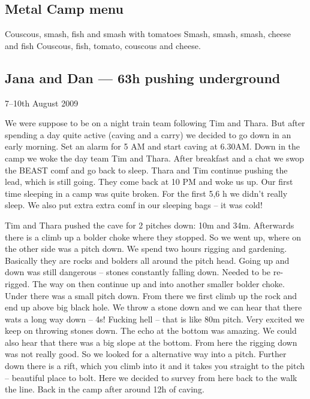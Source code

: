 
\subsection{Metal Camp menu}\label{metal-camp-menu}

Couscous, smash, fish and smash with tomatoes Smash, smash, smash,
cheese and fish Couscous, fish, tomato, couscous and cheese.


\subsection{Jana and Dan --- 63h pushing
underground}\label{jana-and-dan-63h-pushing-underground}

7--10th August 2009

We were suppose to be on a night train team following Tim and Thara. But
after spending a day quite active (caving and a carry) we decided to go
down in an early morning. Set an alarm for 5 AM and start caving at
6.30AM. Down in the camp we woke the day team Tim and Thara. After
breakfast and a chat we swop the BEAST comf and go back to sleep. Thara
and Tim continue pushing the lead, which is still going. They come back
at 10 PM and woke us up. Our first time sleeping in a camp was quite
broken. For the first 5,6 h we didn't really sleep. We also put extra
extra comf in our sleeping bags -- it was cold!

Tim and Thara pushed the cave for 2 pitches down: 10m and 34m.
Afterwards there is a climb up a bolder choke where they stopped. So we
went up, where on the other side was a pitch down. We spend two hours
rigging and gardening. Basically they are rocks and bolders all around
the pitch head. Going up and down was still dangerous -- stones
constantly falling down. Needed to be re-rigged. The way on then
continue up and into another smaller bolder choke. Under there was a
small pitch down. From there we first climb up the rock and end up above
big black hole. We throw a stone down and we can hear that there wats a
long way down -- 4s! Fucking hell -- that is like 80m pitch. Very
excited we keep on throwing stones down. The echo at the bottom was
amazing. We could also hear that there was a big slope at the bottom.
From here the rigging down was not really good. So we looked for a
alternative way into a pitch. Further down there is a rift, which you
climb into it and it takes you straight to the pitch -- beautiful place
to bolt. Here we decided to survey from here back to the walk the line.
Back in the camp after around 12h of caving.

